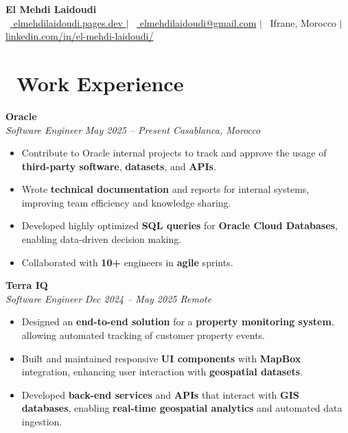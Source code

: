 \documentclass[a4paper, 10pt]{article}
\begin{document}
\begin{center}
    \textbf{\huge El Mehdi Laidoudi} \\[4pt]
    \normalsize
    \faGlobe\ \href{https://elmehdilaidoudi.pages.dev}{ elmehdilaidoudi.pages.dev } $|$
    \faEnvelope\ \href{mailto:elmehdilaidoudi@gmail.com}{ elmehdilaidoudi@gmail.com} $|$ 
    \faMapMarker*\ Ifrane, Morocco $|$ 
    \faLinkedin\ \href{https://linkedin.com/in/el-mehdi-laidoudi/}{ linkedin.com/in/el-mehdi-laidoudi/} 
\end{center}
\vspace{-5pt}

\section{\faBriefcase\ Work Experience} 

\textbf{Oracle} \\
\textit{Software Engineer} \hfill \textit{May 2025 -- Present \textbar{} Casablanca, Morocco}
\begin{itemize}[leftmargin=10pt, itemsep=0pt, topsep=1pt, parsep=0pt]
\item Contribute to Oracle internal projects to track and approve the usage of \textbf{third-party software}, \textbf{datasets}, and \textbf{APIs}.
\item Wrote \textbf{technical documentation} and reports for internal systems, improving team efficiency and knowledge sharing.
\item Developed highly optimized \textbf{SQL queries} for \textbf{Oracle Cloud Databases}, enabling data-driven decision making.
\item Collaborated with \textbf{10+} engineers in \textbf{agile} sprints.
\end{itemize}

\textbf{Terra IQ} \\
\textit{Software Engineer} \hfill \textit{Dec 2024 -- May 2025 \textbar{} Remote}
\begin{itemize}[leftmargin=10pt, itemsep=-1pt, topsep=2pt]
\item Designed an \textbf{end-to-end solution} for a \textbf{property monitoring system}, allowing automated tracking of customer property events.
\item Built and maintained responsive \textbf{UI components} with \textbf{MapBox} integration, enhancing user interaction with \textbf{geospatial datasets}.
\item Developed \textbf{back-end services} and \textbf{APIs} that interact with \textbf{GIS databases}, enabling \textbf{real-time geospatial analytics} and automated data ingestion.
\end{itemize}
\end{document}
